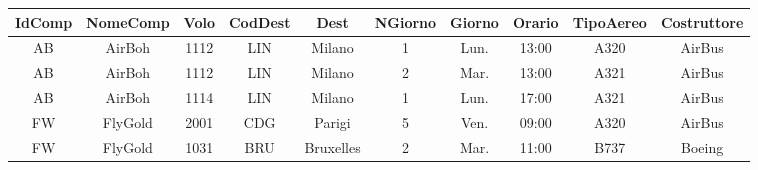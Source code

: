 \documentclass{standalone}
\begin{document}
\begin{tabular}{|c|c|c|c|c|c|c|c|c|c|}
    \hline
    IdComp&NomeComp&Volo&CodDest&Dest&NGiorno&Giorno&Orario&TipoAereo&Costruttore\\\hline
    AB&AirBoh&1112&LIN&Milano&1&Lun.&13:00&A320&AirBus\\\hline
    AB&AirBoh&1112&LIN&Milano&2&Mar.&13:00&A321&AirBus\\\hline
    AB&AirBoh&1114&LIN&Milano&1&Lun.&17:00&A321&AirBus\\\hline
    FW&FlyGold&2001&CDG&Parigi&5&Ven.&09:00&A320&AirBus\\\hline
    FW&FlyGold&1031&BRU&Bruxelles&2&Mar.&11:00&B737&Boeing\\\hline
\end{tabular}
\end{document}
